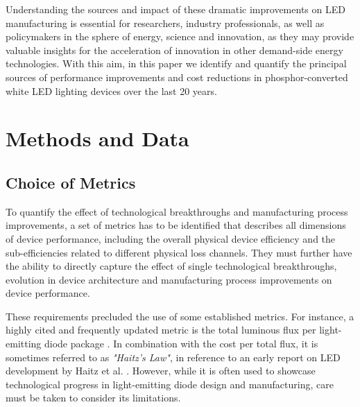 \documentclass[a4paper,nocompress]{spie}  %
\begin{document}
    Understanding the sources and impact of these dramatic improvements on LED manufacturing is essential for researchers, industry professionals, as well as policymakers in the sphere of energy, science and innovation, as they may provide valuable insights for the acceleration of innovation in other demand-side energy technologies. With this aim, in this paper we identify and quantify the principal sources of performance improvements and cost reductions in phosphor-converted white LED lighting devices over the last 20 years. 

\section{Methods and Data}
\label{sec:methods}

\subsection{Choice of Metrics}
\label{subsec:metrics}

    To quantify the effect of technological breakthroughs and manufacturing process improvements, a set of metrics has to be identified that describes all dimensions of device performance, including the overall physical device efficiency and the sub-efficiencies related to different physical loss channels. They must further have the ability to directly capture the effect of single technological breakthroughs, evolution in device architecture and manufacturing process improvements on device performance.
    
    These requirements precluded the use of some established metrics. For instance, a highly cited and frequently updated metric is the total luminous flux per light-emitting diode package \cite{Liu2009,haitz2011solid,cho2017white,Fontoynont2018}. In combination with the cost per total flux, it is sometimes referred to as \textit{"Haitz's Law"}, in reference to an early report on LED development by Haitz et al. \cite{haitz1999case}. However, while it is often used to showcase technological progress in light-emitting diode design and manufacturing, care must be taken to consider its limitations.
    
\end{document}
